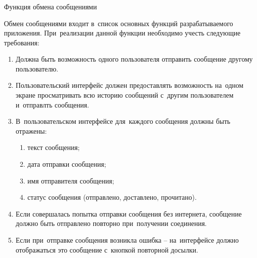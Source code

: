 \subsubsection{} Функция обмена сообщениями
\label{sec:analysis:research:funcreq:messages}

Обмен сообщениями входит в~список основных функций разрабатываемого приложения. При~реализации данной функции необходимо учесть следующие требования:

\begin{enumerate}
	\item Должна быть возможность одного пользователя отправить сообщение другому пользователю.
	\item Пользовательский интерфейс должен предоставлять возможность на~одном экране просматривать всю историю сообщений с~другим пользователем и~отправлть сообщения.
	\item В~пользовательском интерфейсе для~каждого сообщения должны быть отражены:
	\begin{enumerate}
		\item текст сообщения;
		\item дата отправки сообщения;
		\item имя отправителя сообщения;
		\item статус сообщения (отправлено, доставлено, прочитано).
	\end{enumerate}
	\item Если совершалась попытка отправки сообщения без интернета, сообщение должно быть отправлено повторно при~получении соединения.
	\item Если при~отправке сообщения возникла ошибка -- на~интерфейсе должно отображаться это сообщение с~кнопкой повторной досылки.
\end{enumerate}